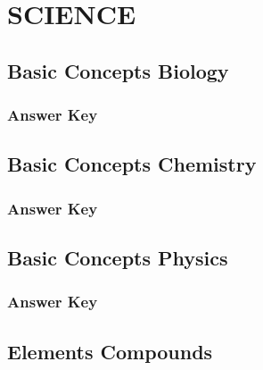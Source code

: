 \documentclass[12pt,a4paper]{book}
\begin{document}
\frontmatter

\tableofcontents

\mainmatter

\chapter{SCIENCE}

\section{Basic Concepts Biology}



\subsection*{Answer Key}



\section{Basic Concepts Chemistry}



\subsection*{Answer Key}



\section{Basic Concepts Physics}



\subsection*{Answer Key}



\section{Elements Compounds}


\end{document}
